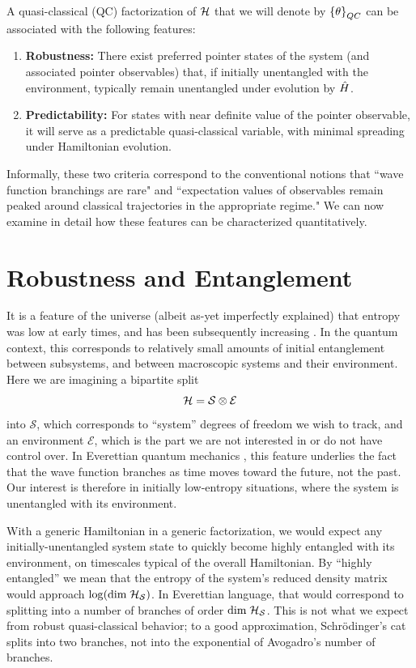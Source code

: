 \documentclass[aps,pra,onecolumn,nofootinbib,notitlepage,11pt,tightenlines]{revtex4-1}
\begin{document}
 A  {quasi-classical} (QC) factorization of $\mathcal{H}$ that we will denote by ${\{\theta\}}_{QC}$ can be associated with the following features:
\begin{enumerate}
\item{\textbf{Robustness:} There exist preferred pointer states of the system (and associated pointer observables) that, if initially unentangled with the environment, typically remain unentangled under evolution by $\hat{H}$.}
\item{\textbf{Predictability:} For states with near definite value of the pointer observable, it will serve as a predictable quasi-classical variable, with minimal spreading under Hamiltonian evolution.}
\end{enumerate}
Informally, these two criteria correspond to the conventional notions that ``wave function branchings are rare" and ``expectation values of observables remain peaked around classical trajectories in the appropriate regime."
We can now examine in detail how these features can be characterized quantitatively.


\section{Robustness and Entanglement}
\label{sec:robustness}

It is a feature of the universe (albeit as-yet imperfectly explained) that entropy was low at early times, and has been subsequently increasing \citep{penrose1979singularities,albert}.
In the quantum context, this corresponds to relatively small amounts of initial entanglement between subsystems, and between macroscopic systems and their environment.
Here we are imagining a bipartite split
\begin{equation}
\hs = \mathcal{S} \otimes \mathcal{E}
\end{equation}
into $\mathcal{S}$, which corresponds to ``system'' degrees of freedom we wish to track, and an environment $\mathcal{E}$, which is the part we are not interested in or do not have control over.
In Everettian quantum mechanics \cite{everett1957relative}, this feature underlies the fact that the wave function branches as time moves toward the future, not the past.
Our interest is therefore in initially low-entropy situations, where the system is unentangled with its environment.

With a generic Hamiltonian in a generic factorization, we would expect any initially-unentangled system state to quickly become highly entangled with its environment, on timescales typical of the overall Hamiltonian.
By ``highly entangled'' we mean that the entropy of the system's reduced density matrix would approach $\log(\mathrm{dim}\; \mathcal{H}_\mathcal{S})$.
In Everettian language, that would correspond to splitting into a number of branches of order $\mathrm{dim}\; \mathcal{H}_\mathcal{S}$.
This is not what we expect from robust quasi-classical behavior; to a good approximation, Schr\"odinger's cat splits into two branches, not into the exponential of Avogadro's number of branches.
\end{document}
